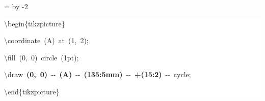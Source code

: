 \begingroup
\ttfamily
{}
=\textwidth
\advance{} by -2\fboxsep
\noindent
\colorbox{background}
{%
\parbox{\dimen255}
{%
\rule[-0.5ex]{0pt}{2.5ex}\hspace*{0.0em}\textbackslash{}begin\{tikzpicture\}\\
\rule[-0.5ex]{0pt}{2.5ex}\hspace*{1.0em}\textbackslash{}coordinate~(A)~at~(1,~2);\\
\rule[-0.5ex]{0pt}{2.5ex}\hspace*{1.0em}\textbackslash{}fill~(0,~0)~circle~(1pt);\\
\rule[-0.5ex]{0pt}{2.5ex}\hspace*{1.0em}\textbackslash{}draw~\textcolor{R}{\textbf{(0,~0)}}~{-}{-}~\textcolor{R}{\textbf{(A)}}~{-}{-}~\textcolor{R}{\textbf{(135:5mm)}}~{-}{-}~\textcolor{R}{\textbf{+(15:2)}}~{-}{-}~cycle;\\
\rule[-0.5ex]{0pt}{2.5ex}\hspace*{0.0em}\textbackslash{}end\{tikzpicture\}}%
}%
\endgroup
